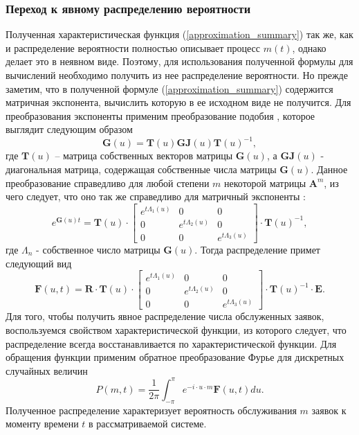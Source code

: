 \subsubsection{Переход к явному распределению вероятности}
Полученная характеристическая функция (\ref{approximation_summary}) так же, как и распределение вероятности полностью описывает процесс $m(t)$, однако делает это в неявном виде. Поэтому, для использования полученной формулы для вычислений необходимо получить из нее распределение вероятности.
Но прежде заметим, что в полученной формуле (\ref{approximation_summary}) содержится матричная экспонента, вычислить которую в ее исходном виде не получится. Для преобразования экспоненты применим преобразование подобия \cite{bronson1991matrix}, которое выглядит следующим образом
\begin{equation*}
	\boldsymbol{G}(u) =\boldsymbol{T}(u)\boldsymbol{GJ}(u)\boldsymbol{T}(u)^{-1},
\end{equation*}
где $\boldsymbol{T}(u)$ – матрица собственных векторов матрицы $\boldsymbol{G}(u)$, а $\boldsymbol{GJ}(u)$ - диагональная матрица, содержащая собственные числа матрицы $\boldsymbol{G}(u)$. Данное преобразование справедливо для любой степени $m$ некоторой матрицы $\boldsymbol{A}^{m}$, из чего следует, что оно так же справедливо для матричный экспоненты \cite{egorov2006prog}:
\begin{equation*}
	e^{\boldsymbol{G}(u)t}=\boldsymbol{T}(u)\cdot \begin{bmatrix}
		e^{t \Lambda_{1}(u)} & 0 &  0\\
		0 & e^{t \Lambda_{2}(u)} & 0\\
		0 & 0 &	e^{t \Lambda_{3}(u)}
	\end{bmatrix} \cdot \boldsymbol{T}(u)^{-1},
\end{equation*}
где $\Lambda_{n}$ - собственное число матрицы $\boldsymbol{G}(u)$. Тогда распределение примет следующий вид
\begin{equation*}
	\boldsymbol{F}(u,t)=\boldsymbol{R} \cdot \boldsymbol{T}(u)\cdot \begin{bmatrix}
		e^{t \Lambda_{1}(u)} & 0 &  0\\
		0 & e^{t \Lambda_{2}(u)} & 0\\
		0 & 0 &	e^{t \Lambda_{3}(u)}
	\end{bmatrix} \cdot \boldsymbol{T}(u)^{-1} \cdot \boldsymbol{E}.
\end{equation*}
Для того, чтобы получить явное распределение числа обслуженных заявок, воспользуемся свойством характеристической функции, из которого следует, что распределение всегда восстанавливается по характеристической функции. Для обращения функции применим обратное преобразование Фурье для дискретных случайных величин
\begin{equation*}
	P(m,t) = \dfrac{1}{2\pi}\int_{-\pi}^{\pi} e^{-i \cdot u \cdot m} \boldsymbol{F}(u,t)du.
\end{equation*}
Полученное распределение характеризует вероятность обслуживания $m$ заявок к моменту времени $t$ в рассматриваемой системе.
\clearpage